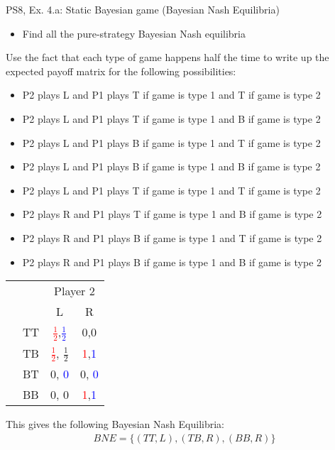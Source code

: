 \begin{frame}{PS8, Ex. 4.a: Static Bayesian game (Bayesian Nash Equilibria)}
\begin{itemize}
    \item[] Find all the pure-strategy Bayesian Nash equilibria
\end{itemize}
Use the fact that each type of game happens half the time to write up the expected payoff matrix for the following possibilities:
\begin{itemize}
    \item P2 plays L and P1 plays T if game is type 1 and T if game is type 2
    \item P2 plays L and P1 plays T if game is type 1 and B if game is type 2
    \item P2 plays L and P1 plays B if game is type 1 and T if game is type 2
    \item P2 plays L and P1 plays B if game is type 1 and B if game is type 2
    \item P2 plays L and P1 plays T if game is type 1 and T if game is type 2
    \item P2 plays R and P1 plays T if game is type 1 and B if game is type 2
    \item P2 plays R and P1 plays B if game is type 1 and T if game is type 2
    \item P2 plays R and P1 plays B if game is type 1 and B if game is type 2
\end{itemize}
        \begin{table}
      \begin{tabular}{cl|c|c|}
        & \multicolumn{1}{c}{} & \multicolumn{2}{c}{\color{blue}Player 2}\\
        \parbox[t]{1mm}{}
        &  &  &  \\
        & TT & \textcolor{red}{$\frac{1}{2}$},\textcolor{blue}{$\frac{1}{2}$} &  0,0  \\
        & TB & \textcolor{red}{$\frac{1}{2}$}, $\frac{1}{2}$  & \textcolor{red}{1},\textcolor{blue}{1}\\
        & BT & 0, \textcolor{blue}{0}  & 0, \textcolor{blue}{0}\\
        & BB & 0, 0  & \textcolor{red}{1},\textcolor{blue}{1}\\
      \end{tabular}
      \end{table}
    This gives the following Bayesian Nash Equilibria:
    \begin{align*}
        BNE=\{(TT,L),(TB,R),(BB,R)\}
    \end{align*}
    \vfill\null\null
\end{frame}
